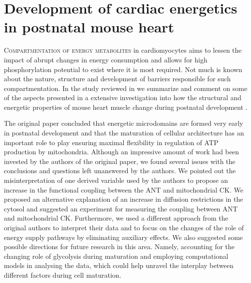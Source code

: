 \chapter{Development of cardiac energetics in postnatal mouse heart}
\label{ch:mice}
\lettrine[lines=2, lhang=0.33, loversize=0.25]{C}{ompartmentation of
energy metabolites} in cardiomyocytes aims to
lessen the impact of abrupt changes in energy consumption and allows for
high phosphorylation potential to exist where it is most required. Not
much is known about the nature, structure and development of barriers responsible for such
compartmentation. In the study reviewed in \PaperI we summarize and
comment on some of the aspects presented in a extensive investigation
into how the structural and energetic properties of mouse heart muscle
change during postnatal development \cite{Piquereau_10_JPhysiol_Lond__588_p2443}.

The original paper concluded that energetic microdomains are formed very
early in postnatal development and that the maturation of cellular
architecture has an important role to play ensuring maximal flexibility
in regulation of \ac{ATP} production by mitochondria. 
%
Although an impressive amount of work had been invested by the authors of
the original paper, we found several issues with the conclusions and questions left
unanswered by the authors. We pointed out the misinterpretation of one
derived variable used by the authors to propose an increase in the
functional coupling between the \ac{ANT} and mitochondrial \ac{CK}. We
proposed an alternative explanation of an increase in diffusion
restrictions in the cytosol and suggested an experiment for measuring
the coupling between \ac{ANT} and mitochondrial \ac{CK}. Furthermore, we
used a different approach from the original authors to interpret their
data and to focus on the changes of the role of energy supply pathways
by eliminating auxiliary effects. We also suggested some possible directions
for future research in this area. Namely, accounting for the changing role of glycolysis
during maturation and employing computational models in analysing the
data, which could help unravel the interplay between different factors
during cell maturation.
